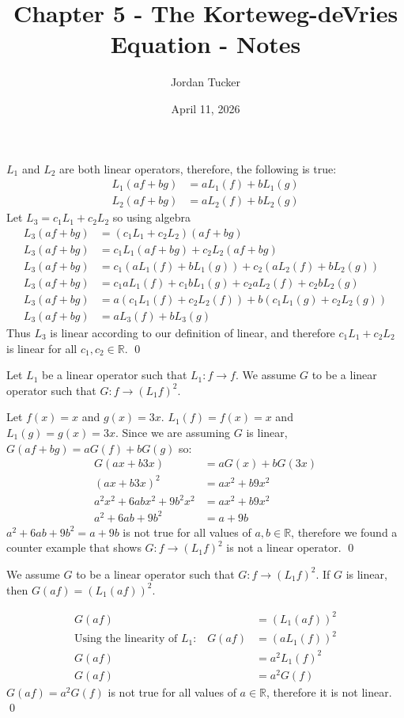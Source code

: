 \documentclass[14pt, letterpaper]{extarticle}
\title{Chapter 5 - The Korteweg-deVries Equation - Notes}
\author{Jordan Tucker}
\date{April 11, 2026}
\begin{document}
    $L_1$ and $L_2$ are both linear operators, therefore, the following is true:\
    \begin{align*}
        L_1(af + bg) &= aL_1(f) + bL_1(g) \\
        L_2(af + bg) &= aL_2(f) + bL_2(g)
    \end{align*}
    Let $L_3 = c_1 L_1 + c_2 L_2$ so using algebra
    \begin{align*}
        L_3(af + bg) &= (c_1 L_1 + c_2 L_2)(af + bg) \\
        L_3(af + bg) &= c_1 L_1(af + bg) + c_2 L_2(af + bg)\\
        L_3(af + bg) &= c_1 (aL_1(f) + b L_1 (g)) + c_2 (aL_2(f) + b L_2 (g))\\
        L_3(af + bg) &=  c_1 aL_1(f) + c_1 b L_1 (g) + c_2 aL_2(f) + c_2 b L_2 (g)\\
        L_3(af + bg) &= a ( c_1 L_1(f) + c_2 L_2(f) ) + b ( c_1 L_1 (g)  + c_2 L_2 (g))\\
        L_3(af + bg) &= a L_3(f) + b L_3(g)
    \end{align*}
    Thus $L_3$ is linear according to our definition of linear, and therefore
    $c_1 L_1 + c_2 L_2$ is linear for all $c_1, c_2 \in \mathbb{R} $. \qed
    \newpage

    Let $L_1$ be a linear operator such that $L_1: f \rightarrow f$.
    We assume $G$ to be a linear operator such that $G: f \rightarrow (L_1 f)^2$.

    Let $f(x) = x$ and $g(x) = 3x$.
    $L_1(f)=f(x)=x$ and $L_1(g)=g(x)=3x$.
    Since we are assuming $G$ is linear, $G(af + bg) = aG(f) + bG(g)$ so:
    \begin{align*}
        G(ax + b3x) &= aG(x) + bG(3x)\\
        (ax+b3x)^2 &= ax^2 + b9x^2 \\
        a^2 x^2 + 6ab x^2 + 9b^2 x^2 &= ax^2 + b9x^2\\
        a^2 + 6ab  + 9b^2  &= a + 9b
    \end{align*}
    $a^2 + 6ab  + 9b^2  = a + 9b$ is not true for all values of $a, b \in \mathbb{R}$, therefore
    we found a counter example that shows $G: f \rightarrow (L_1 f)^2$ is not a linear operator. \qed

    \newpage
    We assume $G$ to be a linear operator such that $G: f \rightarrow (L_1 f)^2$.
    If $G$ is linear, then $G(af) = (L_1(af))^2$.


    \begin{align*}
        G(af) &= (L_1(af))^2 \\
        \text{Using the linearity of $L_1$:}\quad G(af) &= (aL_1(f))^2\\
        G(af) &= a^2 L_1(f)^2\\
        G(af) &= a^2 G(f)
    \end{align*}
    $G(af) = a^2 G(f)$ is not true for all values of $a \in \mathbb{R}$, therefore it is not linear.
    \qed
\end{document}
